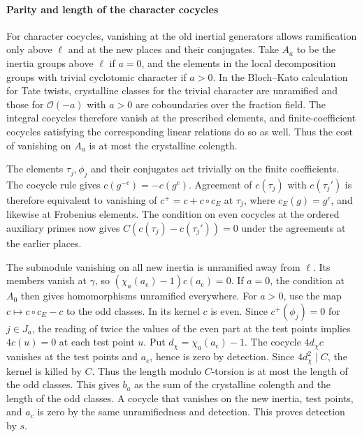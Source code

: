 \paragraph{Parity and length of the character cocycles}
For character cocycles, vanishing at the old inertial generators
allows ramification only above \(\ell\) and at the new places and
their conjugates. Take \(A_a\) to be the inertia groups above \(\ell\)
if \(a=0\), and the elements in the local decomposition groups
with trivial cyclotomic character if \(a>0\).
In the Bloch--Kato calculation for Tate twists, crystalline
classes for the trivial character are unramified and those for
\(\mathcal O(-a)\) with \(a>0\) are coboundaries over the fraction
field. The integral cocycles therefore vanish at the prescribed
elements, and finite-coefficient cocycles satisfying the
corresponding linear relations do so as well.
Thus the cost of vanishing on \(A_a\) is at most the crystalline
colength.

The elements \(\tau_j,\phi_j\) and their conjugates act trivially
on the finite coefficients. The cocycle rule gives
\(c(g^{-c})=-c(g^c)\). Agreement of \(c(\tau_j)\) with
\(c(\tau_j')\) is therefore equivalent to vanishing of
\(c^+=c+c\circ c_E\) at \(\tau_j\), where \(c_E(g)=g^c\),
and likewise at Frobenius elements.
The condition on even cocycles at the ordered auxiliary primes
now gives \(C(c(\tau_j)-c(\tau_j'))=0\) under the agreements at
the earlier places.

The submodule vanishing on all new inertia is unramified away
from \(\ell\). Its members vanish at \(\gamma\), so
\((\chi_a(a_{\mathrm c})-1)c(a_{\mathrm c})=0\).
If \(a=0\), the condition at \(A_0\) then gives homomorphisms
unramified everywhere. For \(a>0\), use the map
\(c\mapsto c\circ c_E-c\) to the odd classes.
In its kernel \(c\) is even. Since \(c^+(\phi_j)=0\) for
\(j\in J_a\), the reading of twice the values of the even
part at the test points implies \(4c(u)=0\) at each test point \(u\).
Put \(d_\chi=\chi_a(a_{\mathrm c})-1\). The cocycle \(4d_\chi c\)
vanishes at the test points and \(a_{\mathrm c}\), hence is zero
by detection. Since \(4d_\chi^2\mid C\), the kernel is killed
by \(C\). Thus the length modulo \(C\)-torsion is at most
the length of the odd classes. This gives \(b_a\) as the sum
of the crystalline colength and the length of the odd classes.
A cocycle that vanishes on the new inertia, test points, and
\(a_{\mathrm c}\) is zero by the same unramifiedness and detection.
This proves detection by \(s\).
